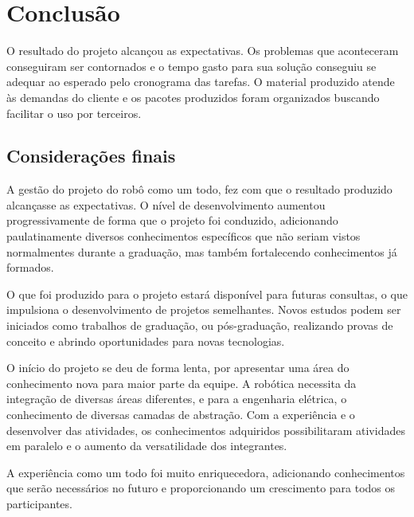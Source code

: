 \chapter{Conclusão}
\label{chap:conc}

O resultado do projeto alcançou as expectativas. Os problemas que aconteceram conseguiram ser contornados e o tempo gasto para sua solução conseguiu se adequar ao esperado pelo cronograma das tarefas. O material produzido atende às demandas do cliente e os pacotes produzidos foram organizados buscando facilitar o uso por terceiros.


\section{Considerações finais}
\label{sec:consid}

A gestão do projeto do robô como um todo, fez com que o resultado produzido alcançasse as expectativas. O nível de desenvolvimento aumentou progressivamente de forma que o projeto foi conduzido, adicionando paulatinamente diversos conhecimentos específicos que não seriam vistos normalmentes durante a graduação, mas também fortalecendo conhecimentos já formados.

O que foi produzido para o projeto estará disponível para futuras consultas, o que impulsiona o desenvolvimento de projetos semelhantes. Novos estudos podem ser iniciados como trabalhos de graduação, ou pós-graduação, realizando provas de conceito e abrindo oportunidades para novas tecnologias.

O início do projeto se deu de forma lenta, por apresentar uma área do conhecimento nova para maior parte da equipe. A robótica necessita da integração de diversas áreas diferentes, e para a engenharia elétrica, o conhecimento de diversas camadas de abstração. Com a experiência e o desenvolver das atividades, os conhecimentos adquiridos possibilitaram atividades em paralelo e o aumento da versatilidade dos integrantes.

A experiência como um todo foi muito enriquecedora, adicionando conhecimentos que serão necessários no futuro e proporcionando um crescimento para todos os participantes.
